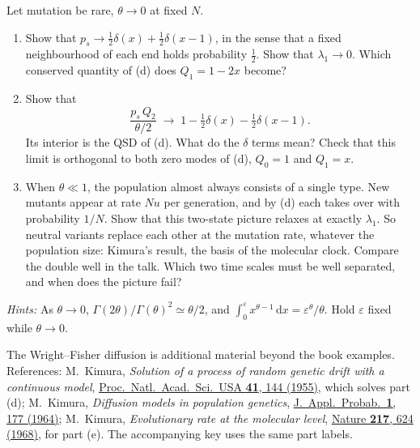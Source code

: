 \documentclass[11pt]{article}
\newcommand{\dd}{\mathrm{d}}
\newcommand{\exsec}[1]{\par\vspace{4pt}{\sffamily\bfseries\large\color{PineGreen}#1}\par\vspace{-2pt}}
\begin{document}
\exsec{(e) Optional: from one to the other}
Let mutation be rare, $\theta\to0$ at fixed $N$.
\begin{enumerate}
  \item Show that $p_s\to\tfrac12\delta(x)+\tfrac12\delta(x-1)$, in the sense that a fixed neighbourhood of each end
        holds probability $\tfrac12$. Show that $\lambda_1\to0$. Which conserved quantity of (d) does $Q_1=1-2x$
        become?
  \item Show that
        \[ \frac{p_s\,Q_2}{\theta/2}\;\longrightarrow\;1-\tfrac12\delta(x)-\tfrac12\delta(x-1). \]
        Its interior is the QSD of (d). What do the $\delta$ terms mean? Check that this limit is orthogonal to
        both zero modes of (d), $Q_0=1$ and $Q_1=x$.
  \item When $\theta\ll1$, the population almost always consists of a single type. New mutants appear at rate $Nu$
        per generation, and by (d) each takes over with probability $1/N$. Show that this two-state picture
        relaxes at exactly $\lambda_1$. So neutral variants replace each other at the mutation rate, whatever the
        population size: Kimura's result, the basis of the molecular clock. Compare the double well in the talk.
        Which two time scales must be well separated, and when does the picture fail?
\end{enumerate}
\emph{Hints:} As $\theta\to0$, $\Gamma(2\theta)/\Gamma(\theta)^2\simeq\theta/2$, and
$\int_0^\varepsilon x^{\theta-1}\,\dd x=\varepsilon^\theta/\theta$. Hold $\varepsilon$ fixed while $\theta\to0$.

\vfill

{\footnotesize The Wright--Fisher diffusion is additional material beyond the book examples. References:
M.~Kimura, \emph{Solution of a process of random genetic drift with a continuous model},
\href{https://doi.org/10.1073/pnas.41.3.144}{Proc.\ Natl.\ Acad.\ Sci.\ USA \textbf{41}, 144 (1955)}, which solves
part (d); M.~Kimura, \emph{Diffusion models in population genetics},
\href{https://doi.org/10.1017/S0021900200108368}{J.\ Appl.\ Probab.\ \textbf{1}, 177 (1964)}; M.~Kimura,
\emph{Evolutionary rate at the molecular level},
\href{https://doi.org/10.1038/217624a0}{Nature \textbf{217}, 624 (1968)}, for part (e). The accompanying key uses
the same part labels.\par}
\end{document}
